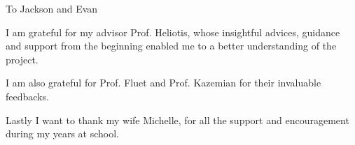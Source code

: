 \documentclass[12pt,american]{report}
\begin{document}
\vfill
\begin{center}
To Jackson and Evan
\end{center}
\vfill

%
I am grateful for my advisor Prof. Heliotis, whose insightful advices, guidance and support from the beginning enabled me to a better understanding of the project.

I am also grateful for Prof. Fluet and Prof. Kazemian for their invaluable feedbacks.

Lastly I want to thank my wife Michelle, for all the support and encouragement during my years at school.

\newcommand{\etc} {\emph{etc.\/}}
\newcommand{\etal}{\emph{et~al.\/}}
\newcommand{\eg}  {\emph{e.g.\/}}
\newcommand{\ie}  {\emph{i.e.\/}}






\afterpreface%
\end{document}
